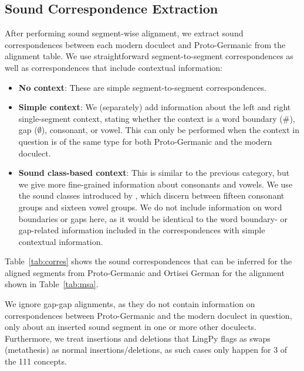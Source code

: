 \documentclass[a4paper]{article}
\begin{document}
\subsection{Sound Correspondence Extraction}

After performing sound segment-wise alignment,
we extract sound correspondences between each
modern doculect and Proto-Germanic from the alignment table.
We use straightforward segment-to-segment correspondences
as well as correspondences that include contextual information:

\begin{itemize}
\item
\textbf{No context}:
These are simple segment-to-segment correspondences.

\item
\textbf{Simple context}:
We (separately) add information about the
left and right single-segment context,
stating whether the context is a
word boundary (\#), gap ($\emptyset$), consonant, or vowel. 
This can only be performed when the context in question is of
the same type for both Proto-Germanic and the modern doculect.

\item
\textbf{Sound class-based context}:
This is similar to the previous category,
but we give more fine-grained information about consonants and vowels.
We use the sound classes introduced by \citet{list2012sca},
which discern between fifteen consonant groups and sixteen vowel groups.
We do not include information on word boundaries or gaps here,
as it would be identical to the word boundary- or gap-related information
included in the correspondences with simple contextual information.

\end{itemize}


Table~\ref{tab:corres} shows the sound correspondences
that can be inferred for the aligned segments
from Proto-Germanic and Ortisei German for the alignment
shown in Table~\ref{tab:msa}.

We ignore gap-gap alignments,
as they do not contain information on correspondences
between Proto-Germanic and the modern doculect in question,
only about an inserted sound segment in one or more other doculects.
Furthermore, we treat insertions and deletions
that LingPy flags as swaps (metathesis) as normal insertions/deletions,
as such cases only happen for 3 of the 111 concepts.
\end{document}
